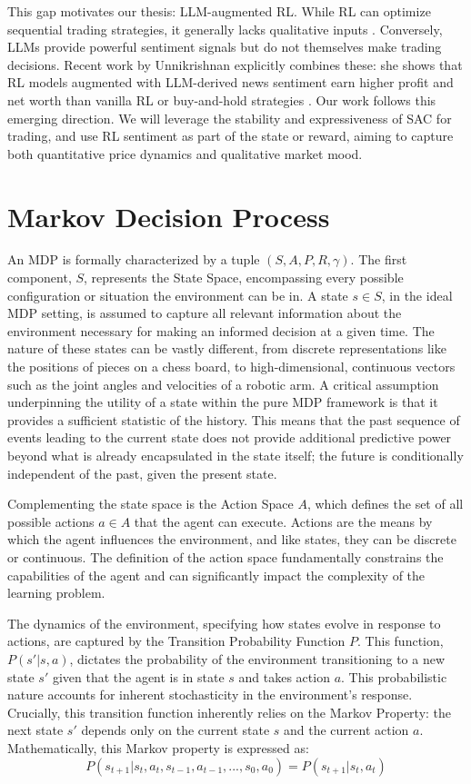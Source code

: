 This gap motivates our thesis: \gls{LLM}-augmented \gls{RL}. While \gls{RL} can optimize sequential trading strategies, it generally lacks qualitative inputs \cite{Hambly2023}. Conversely, \gls{LLM}s provide powerful sentiment signals but do not themselves make trading decisions. Recent work by Unnikrishnan explicitly combines these: she shows that \gls{RL} models augmented with \gls{LLM}-derived news sentiment earn higher profit and net worth than vanilla \gls{RL} or buy-and-hold strategies \cite{Unnikrishnan2024}. Our work follows this emerging direction. We will leverage the stability and expressiveness of \gls{SAC} for trading, and use \gls{RL} sentiment as part of the state or reward, aiming to capture both quantitative price dynamics and qualitative market mood.

\section{Markov Decision Process}
\label{sec:mdp}
An \gls{MDP} is formally characterized by a tuple \((S, A, P, R, \gamma)\). The first component, \(S\), represents the State Space, encompassing every possible configuration or situation the environment can be in. A state \(s \in S\), in the ideal \gls{MDP} setting, is assumed to capture all relevant information about the environment necessary for making an informed decision at a given time. The nature of these states can be vastly different, from discrete representations like the positions of pieces on a chess board, to high-dimensional, continuous vectors such as the joint angles and velocities of a robotic arm. A critical assumption underpinning the utility of a state within the pure \gls{MDP} framework is that it provides a sufficient statistic of the history. This means that the past sequence of events leading to the current state does not provide additional predictive power beyond what is already encapsulated in the state itself; the future is conditionally independent of the past, given the present state.

Complementing the state space is the Action Space \(A\), which defines the set of all possible actions \(a \in A\) that the agent can execute. Actions are the means by which the agent influences the environment, and like states, they can be discrete or continuous. The definition of the action space fundamentally constrains the capabilities of the agent and can significantly impact the complexity of the learning problem.

The dynamics of the environment, specifying how states evolve in response to actions, are captured by the Transition Probability Function \(P\). This function, \(P(s' | s, a)\), dictates the probability of the environment transitioning to a new state \(s'\) given that the agent is in state \(s\) and takes action \(a\). This probabilistic nature accounts for inherent stochasticity in the environment's response. Crucially, this transition function inherently relies on the Markov Property: the next state \(s'\) depends only on the current state \(s\) and the current action \(a\). Mathematically, this Markov property is expressed as: 
\[P(s_{t+1}| s_t, a_t, s_{t-1}, a_{t-1}, ..., s_0, a_0) = P(s_{t+1} | s_t, a_t)\]

